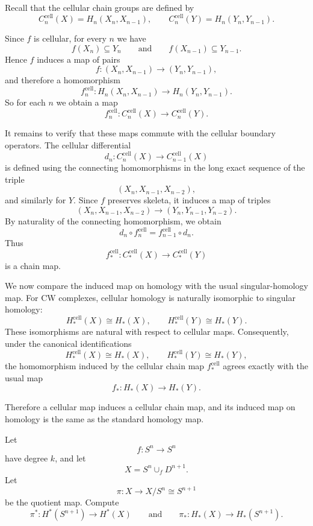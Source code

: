 \begin{solution}
Recall that the cellular chain groups are defined by
\[
C_n^{\mathrm{cell}}(X)=H_n(X_n,X_{n-1}),
\qquad
C_n^{\mathrm{cell}}(Y)=H_n(Y_n,Y_{n-1}).
\]

Since \(f\) is cellular, for every \(n\) we have
\[
f(X_n)\subseteq Y_n
\qquad\text{and}\qquad
f(X_{n-1})\subseteq Y_{n-1}.
\]
Hence \(f\) induces a map of pairs
\[
f:(X_n,X_{n-1})\to (Y_n,Y_{n-1}),
\]
and therefore a homomorphism
\[
f_n^{\mathrm{cell}}:
H_n(X_n,X_{n-1})\longrightarrow H_n(Y_n,Y_{n-1}).
\]
So for each \(n\) we obtain a map
\[
f_n^{\mathrm{cell}}:C_n^{\mathrm{cell}}(X)\to C_n^{\mathrm{cell}}(Y).
\]

It remains to verify that these maps commute with the cellular boundary operators. The cellular differential
\[
d_n:C_n^{\mathrm{cell}}(X)\to C_{n-1}^{\mathrm{cell}}(X)
\]
is defined using the connecting homomorphisms in the long exact sequence of the triple
\[
(X_n,X_{n-1},X_{n-2}),
\]
and similarly for \(Y\). Since \(f\) preserves skeleta, it induces a map of triples
\[
(X_n,X_{n-1},X_{n-2})\to (Y_n,Y_{n-1},Y_{n-2}).
\]
By naturality of the connecting homomorphism, we obtain
\[
d_n\circ f_n^{\mathrm{cell}}
=
f_{n-1}^{\mathrm{cell}}\circ d_n.
\]
Thus
\[
f_*^{\mathrm{cell}}:C_*^{\mathrm{cell}}(X)\to C_*^{\mathrm{cell}}(Y)
\]
is a chain map.

We now compare the induced map on homology with the usual singular-homology map. For CW complexes, cellular homology is naturally isomorphic to singular homology:
\[
H_*^{\mathrm{cell}}(X)\cong H_*(X),
\qquad
H_*^{\mathrm{cell}}(Y)\cong H_*(Y).
\]
These isomorphisms are natural with respect to cellular maps. Consequently, under the canonical identifications
\[
H_*^{\mathrm{cell}}(X)\cong H_*(X),
\qquad
H_*^{\mathrm{cell}}(Y)\cong H_*(Y),
\]
the homomorphism induced by the cellular chain map \(f_*^{\mathrm{cell}}\) agrees exactly with the usual map
\[
f_*:H_*(X)\to H_*(Y).
\]

\par

Therefore a cellular map induces a cellular chain map, and its induced map on homology is the same as the standard homology map.

\par
\end{solution}

\begin{problem}[CP-VIII-0063 --- The quotient map for \(X=S^n\cup_f D^{n+1}\)]
Let
\[
f:S^n\to S^n
\]
have degree \(k\), and let
\[
X=S^n\cup_f D^{n+1}.
\]
Let
\[
\pi:X\to X/S^n\cong S^{n+1}
\]
be the quotient map. Compute
\[
\pi^*:H^*(S^{n+1})\to H^*(X)
\qquad\text{and}\qquad
\pi_*:H_*(X)\to H_*(S^{n+1}).
\]

\par
\end{problem}

